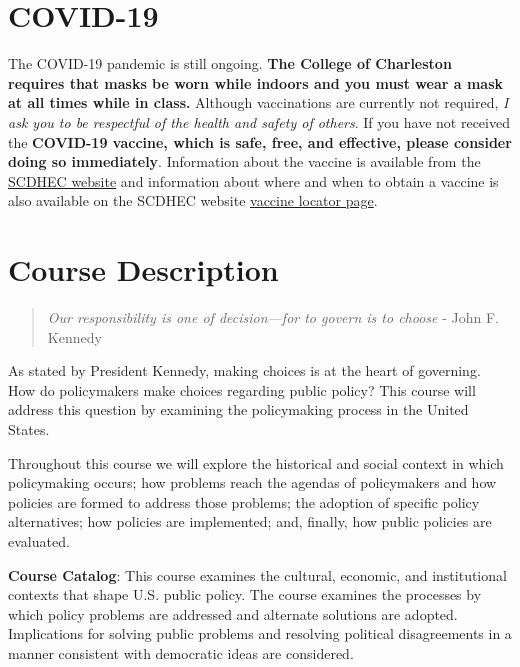 \hypertarget{covid-19}{%
\section{COVID-19}\label{covid-19}}

The COVID-19 pandemic is still ongoing. \textbf{The College of
Charleston requires that masks be worn while indoors and you must wear a
mask at all times while in class.} Although vaccinations are currently
not required, \emph{I ask you to be respectful of the health and safety
of others}. If you have not received the \textbf{COVID-19 vaccine, which
is safe, free, and effective, please consider doing so immediately}.
Information about the vaccine is available from the
\href{https://scdhec.gov/covid19/covid-19-vaccine}{SCDHEC website} and
information about where and when to obtain a vaccine is also available
on the SCDHEC website \href{https://vaxlocator.dhec.sc.gov/}{vaccine
locator page}.

\hypertarget{course-description}{%
\section{Course Description}\label{course-description}}

\begin{quote}
\emph{Our responsibility is one of decision---for to govern is to
choose} - John F. Kennedy
\end{quote}

\vspace{0.1in}

\noindent As stated by President Kennedy, making choices is at the heart
of governing. How do policymakers make choices regarding public policy?
This course will address this question by examining the policymaking
process in the United States.

\vspace{0.1in}

\noindent Throughout this course we will explore the historical and
social context in which policymaking occurs; how problems reach the
agendas of policymakers and how policies are formed to address those
problems; the adoption of specific policy alternatives; how policies are
implemented; and, finally, how public policies are evaluated.

\vspace{0.1in}

\noindent \textbf{Course Catalog}: This course examines the cultural,
economic, and institutional contexts that shape U.S. public policy. The
course examines the processes by which policy problems are addressed and
alternate solutions are adopted. Implications for solving public
problems and resolving political disagreements in a manner consistent
with democratic ideas are considered.

